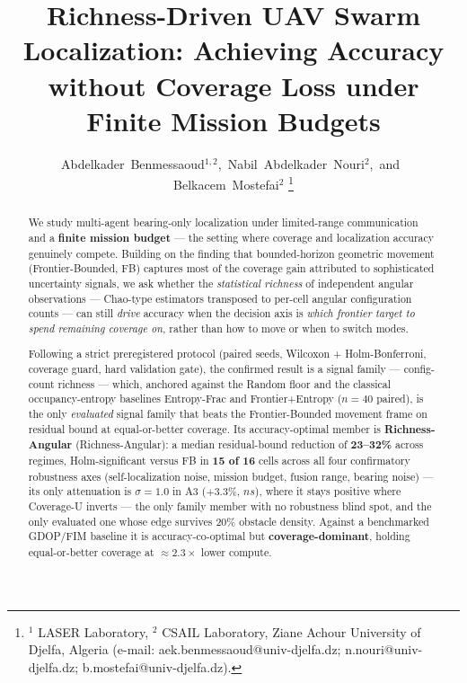 \documentclass[journal]{IEEEtran}
\newcommand{\CU}{Coverage-U}
\newcommand{\FB}{Frontier-Bounded}
\newcommand{\RA}{Richness-Angular}
\begin{document}
\title{Richness-Driven UAV Swarm Localization: Achieving Accuracy without
Coverage Loss under Finite Mission Budgets}

\author{Abdelkader~Benmessaoud$^{1,2}$,~Nabil~Abdelkader~Nouri$^{2}$,~and~%
Belkacem~Mostefai$^{2}$%
\thanks{$^{1}$ LASER Laboratory, $^{2}$ CSAIL Laboratory, Ziane Achour
University of Djelfa, Algeria (e-mail: aek.benmessaoud@univ-djelfa.dz;
n.nouri@univ-djelfa.dz; b.mostefai@univ-djelfa.dz).}}


\maketitle


\begin{abstract}
We study multi-agent bearing-only localization under limited-range
communication and a \textbf{finite mission budget} --- the setting where
coverage and localization accuracy genuinely compete. Building on the finding
that bounded-horizon geometric movement (\FB, FB) captures most of the coverage
gain attributed to sophisticated uncertainty signals, we ask whether the
\emph{statistical richness} of independent angular observations --- Chao-type
estimators transposed to per-cell angular configuration counts --- can still
\emph{drive} accuracy when the decision axis is \emph{which frontier target to
spend remaining coverage on}, rather than how to move or when to switch modes.

Following a strict preregistered protocol (paired seeds, Wilcoxon +
Holm-Bonferroni, coverage guard, hard validation gate), the confirmed result
is a signal family --- config-count richness --- which, anchored against the
Random floor and the classical occupancy-entropy baselines Entropy-Frac and
Frontier+Entropy ($n = 40$ paired), is the only \emph{evaluated} signal family that beats the
\FB{} movement frame on residual bound at equal-or-better coverage. Its
accuracy-optimal member is \textbf{Richness-Angular} (\RA{}): a median
residual-bound reduction of \textbf{23--32\%} across regimes, Holm-significant
versus FB in \textbf{15 of 16} cells across all four confirmatory robustness
axes (self-localization noise, mission budget, fusion range, bearing noise) ---
its only attenuation is $\sigma = 1.0$ in A3 ($+3.3\%$, $ns$), where it stays
positive where \CU{} inverts --- the only family member with no robustness
blind spot, and the only evaluated one whose edge survives 20\% obstacle density.
Against a benchmarked GDOP/FIM baseline it is accuracy-co-optimal but
\textbf{coverage-dominant}, holding equal-or-better coverage at
$\approx 2.3\times$ lower compute.


\end{abstract}
\end{document}
